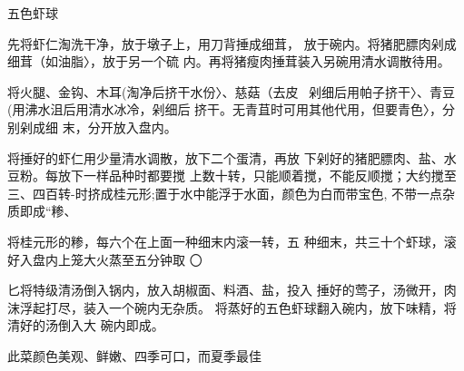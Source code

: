 \begin{recipe}{五色虾球}

\ingredients



\cooking

\step 先将虾仁淘洗干净，放于墩子上，用刀背捶成细茸， 放于碗内。将猪肥膘肉剁成细茸（如油脂〉，放于另一个硫 内。再将猪瘦肉捶茸装入另碗用清水调散待用。

\step 将火腿、金钩、木耳(淘净后挤干水份〉、慈菇（去皮~ 剁细后用帕子挤干〉、青豆(用沸水沮后用清水冰冷，剁细后 挤干。无青苴时可用其他代用，但要青色〉，分别剁成细 末，分开放入盘内。

将捶好的虾仁用少量清水调散，放下二个蛋清，再放 下剁好的猪肥膘肉、盐、水豆粉。每放下一样品种时都要搅 上数十转，只能顺着搅，不能反顺搅；大约搅至三、四百转-时挤成桂元形;置于水中能浮于水面，颜色为白而带宝色, 不带一点杂质即成“糁、

将桂元形的糁，每六个在上面一种细末内滚一转，五 种细末，共三十个虾球，滚好入盘内上笼大火蒸至五分钟取 〇

匕将特级清汤倒入锅内，放入胡椒面、料酒、盐，投入 捶好的莺子，汤微开，肉沫浮起打尽，装入一个碗内无杂质。 将蒸好的五色虾球翻入碗内，放下味精，将清好的汤倒入大 碗内即成。

\notes

此菜颜色美观、鲜嫩、四季可口，而夏季最佳

\end{recipe}


